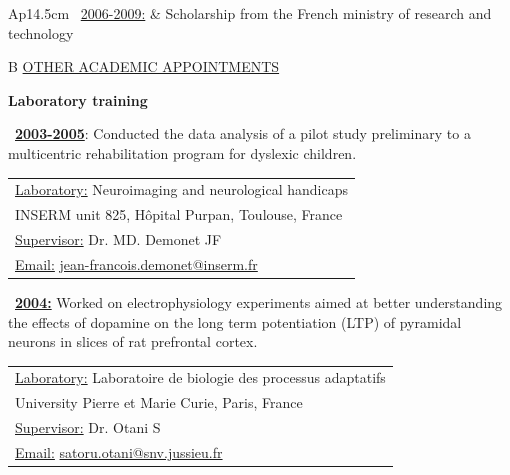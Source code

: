 \documentclass[a4paper,12pt,oneside]{letter}
\begin{document}
{\begin{tabular}{Ap{14.5cm}}
\textbullet~\underline{2006-2009:} & Scholarship from the French ministry of research and technology \\
\end{tabular}



\medskip 

\begin{tabular}{B}
 \underline{OTHER ACADEMIC APPOINTMENTS}
\end{tabular}

\begin{center}
\large\textbf{Laboratory training}
\end{center}

\begin{minipage}[c]{7.7cm}
\textbullet~\underline{\textbf{2003-2005}}: Conducted the data analysis of a pilot study preliminary to a multicentric rehabilitation program for dyslexic children.
\end{minipage}
\hfill
\begin{minipage}[c]{10cm}
\setlength\minrowclearance{0.2cm}
\setlength\arrayrulewidth{1.5pt}
\small
\begin{tabular}[t]{|l|}\hline
\underline{Laboratory:} Neuroimaging and neurological handicaps\\
INSERM unit 825, Hôpital Purpan, Toulouse, France\\
\underline{Supervisor:} Dr. MD. Demonet JF\\
\underline{Email:} \href{mailto:jean-francois.demonet@inserm.fr}{jean-francois.demonet@inserm.fr}\\
\hline
\end{tabular}
\end{minipage}

\begin{minipage}[c]{6.7cm}
\textbullet~\underline{\textbf{2004:}}	Worked on electrophysiology experiments aimed at better understanding the effects of dopamine on the long term potentiation (LTP) of pyramidal neurons in slices of rat prefrontal cortex.
\end{minipage}
\hspace{3mm}
\begin{minipage}[c]{\textwidth}
\setlength\minrowclearance{0.1cm}
\setlength\arrayrulewidth{1.5pt}
\small
\begin{tabular}[c]{|l|}\hline
\underline{Laboratory:} Laboratoire de biologie des processus adaptatifs\\
University Pierre et Marie Curie, Paris, France\\
\underline{Supervisor:} Dr. Otani S\\
\underline{Email:} \href{mailto:satoru.otani@snv.jussieu.fr}{satoru.otani@snv.jussieu.fr}\\ \hline
\end{tabular}
\end{minipage}

}
\end{document}

